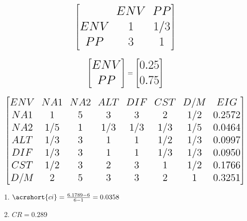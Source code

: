 \documentclass[aspectratio=1610,pdftex,dvipsnames,compress,xcolor={dvipsnames}]{beamer}
\newcommand{\acs}{\acrshort} %
\begin{document}
\begin{frame}{}
    \begin{equation}
        \LARGE
        \begin{bmatrix}
            & ENV & PP \\
            ENV & 1 & 1/3 \\
            PP & 3 & 1
        \end{bmatrix}
    \end{equation}

    \begin{equation}
        \LARGE
        \begin{bmatrix} ENV \\ PP \end{bmatrix} =
        \begin{bmatrix} 0.25 \\ 0.75 \end{bmatrix}
    \end{equation}
\end{frame}


\begin{frame}{}
    \begin{equation}
        \Large
        \begin{bmatrix}
            ENV &NA1 &NA2 &ALT &DIF &CST &D/M &EIG \\
            NA1 &1 &5 &3 &3 &2 &1/2 &0.2572 \\
            NA2 &1/5 &1 &1/3 &1/3 &1/3 &1/5 &0.0464 \\
            ALT &1/3 &3 &1 &1 &1/2 &1/3 &0.0997 \\
            DIF &1/3 &3 &1 &1 &1/3 &1/3 &0.0950 \\ 
            CST &1/2 &3 &2 &3 &1 &1/2 &0.1766 \\ 
            D/M &2 &5 &3 &3 &2 &1 &0.3251 
        \end{bmatrix} 
    \end{equation}

    \begin{enumerate}[series=outerlist,topsep=0pt,itemsep=5pt,leftmargin=*,label=(\arabic*)]
        \item[]$\acs{ci} = \frac{6.1789-6}{6-1} = 0.0358$
        \item[]$CR = 0.289$
    \end{enumerate}
\end{frame}
\end{document}
